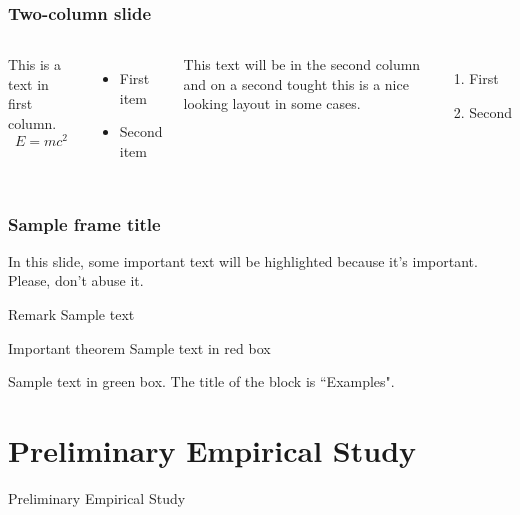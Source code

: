 \documentclass[aspectratio=169,t]{beamer}
\begin{document}
\begin{frame}
\frametitle{Two-column slide}

\begin{columns}

This is a text in first column.
$$E=mc^2$$
\begin{itemize}
\item First item
\item Second item
\end{itemize}

This text will be in the second column
and on a second tought this is a nice looking
layout in some cases.
\begin{enumerate}
    \item First
    \item Second
\end{enumerate}
\end{columns}
\end{frame}


\begin{frame}
\frametitle{Sample frame title}

In this slide, some important text will be
\alert{highlighted} because it's important.
Please, don't abuse it.

\begin{block}{Remark}
Sample text
\end{block}

\begin{alertblock}{Important theorem}
Sample text in red box
\end{alertblock}

\begin{examples}
Sample text in green box. The title of the block is ``Examples".
\end{examples}
\end{frame}




\section{Preliminary Empirical Study}
\begin{frame}{Preliminary Empirical Study}

\end{frame}
\end{document}
